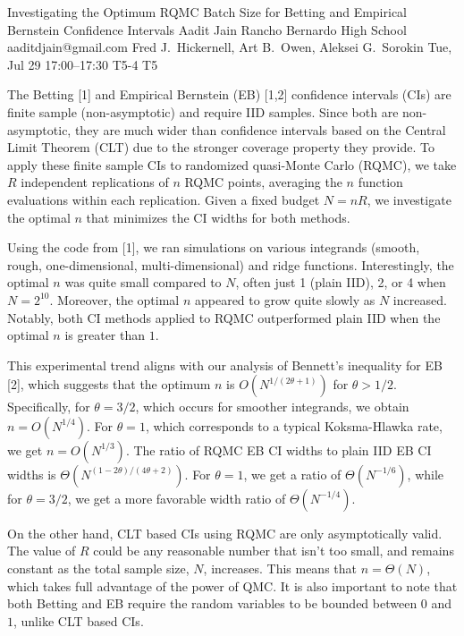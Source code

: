 \documentclass[12pt,lettersize,oneside]{book} %
\begin{document}
\begin{talk}
  {Investigating the Optimum RQMC Batch Size for Betting and Empirical Bernstein Confidence Intervals}%
  {Aadit Jain}%
  {Rancho Bernardo High School}%
  {aaditdjain@gmail.com}%
  {Fred J.\ Hickernell, Art B.\ Owen, Aleksei G.\ Sorokin}%
  {}%
  {Tue, Jul 29 17:00--17:30}%
  {T5-4}%
  {T5}%
  
    
   

The Betting [1] and Empirical Bernstein (EB) [1,2] confidence intervals (CIs) are finite sample (non-asymptotic) and require IID samples. Since both are non-asymptotic, they are much wider than confidence intervals based on the Central Limit Theorem (CLT) due to the stronger coverage property they provide. To apply these finite sample CIs to randomized quasi-Monte Carlo (RQMC), we take $R$ independent replications of $n$ RQMC points, averaging the $n$ function evaluations within each replication. Given a fixed budget $N = nR$, we investigate the optimal $n$ that minimizes the CI widths for both methods.  

Using the code from [1], we ran simulations on various integrands (smooth, rough, one-dimensional, multi-dimensional) and ridge functions. Interestingly, the optimal $n$ was quite small compared to $N$, often just 1 (plain IID), 2, or 4 when $N = 2^{10}$. Moreover, the optimal $n$ appeared to grow quite slowly as $N$ increased. Notably, both CI methods applied to RQMC outperformed plain IID when the optimal $n$ is greater than $1$.  

This experimental trend aligns with our analysis of Bennett’s inequality for EB [2], which suggests that the optimum $n$ is $O(N^{1/(2\theta + 1)})$ for $\theta > 1/2$. 
Specifically, for $\theta = 3/2$, which occurs for smoother integrands, we obtain $n = O(N^{1/4})$. For $\theta = 1$, which corresponds to a typical Koksma-Hlawka rate, we get $n = O(N^{1/3})$. The ratio of RQMC EB CI widths to plain IID EB CI widths is $\Theta( N^{(1-2\theta)/(4\theta+2)})$. For $\theta=1$,
we get a ratio of $\Theta(N^{-1/6})$,
while for $\theta=3/2$,
we get a more favorable width ratio of $\Theta(N^{-1/4})$. 


On the other hand, CLT based CIs using RQMC  are only asymptotically valid. The value of $R$ could be any reasonable number that isn't too small, and remains constant as the total sample size, $N$, increases.  This means that $n = \Theta(N)$, which takes full advantage of the power of QMC.  It is also important to note that both Betting and EB require the random variables to be bounded between $0$ and $1$, unlike CLT based CIs. 



\end{talk}
\end{document}
